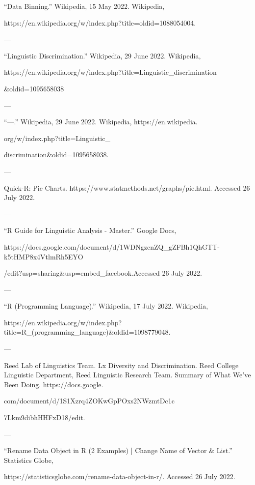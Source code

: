 \documentclass{scrartcl}
\begin{document}
\SMALL “Data Binning.” Wikipedia, 15 May 2022. Wikipedia, \par
https://en.wikipedia.org/w/index.php?title=oldid=1088054004. \par

---

\SMALL “Linguistic Discrimination.” Wikipedia, 29 June 2022. Wikipedia,\par 
https://en.wikipedia.org/w/index.php?title=Linguistic_discrimination\par
&oldid=1095658038\par

---

“---.” Wikipedia, 29 June 2022. Wikipedia, https://en.wikipedia. \par
org/w/index.php?title=Linguistic_ \par discrimination&oldid=1095658038. \par

---

Quick-R: Pie Charts. https://www.statmethods.net/graphs/pie.html. Accessed 26 July 2022.\par

---

“R Guide for Linguistic Analysis - Master.” Google Docs, \par https://docs.google.com/document/d/1WDNgzcnZQ_gZFBh1QhGTT-k5tHMP8x4VtlmRh5EYO \par
/edit?usp=sharing&usp=embed_facebook.Accessed 26 July 2022.\par

---

“R (Programming Language).” Wikipedia, 17 July 2022. Wikipedia, \par https://en.wikipedia.org/w/index.php?title=R_(programming_language)&oldid=1098779048. \par

---

Reed Lab of Linguistics Team. Lx Diversity and Discrimination. Reed College Linguistic Department, Reed Linguistic Research Team. Summary of What We’ve Been Doing. https://docs.google. \par
com/document/d/1S1Xzrq4ZOKwGpPOxs2NWzmtDc1c \par
7Lkm9dibhHHFxD18/edit.\par

---

“Rename Data Object in R (2 Examples) | Change Name of Vector & List.” Statistics Globe, \par https://statisticsglobe.com/rename-data-object-in-r/. Accessed 26 July 2022. \par
\end{document}
